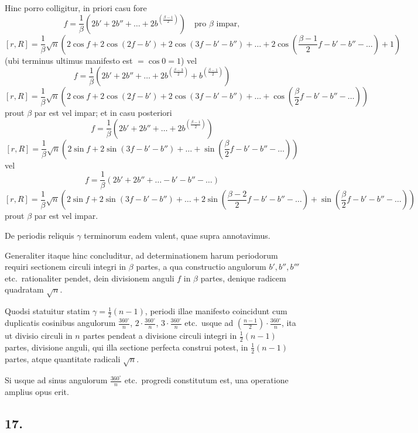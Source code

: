 \documentclass[12pt,a4paper]{article}
\begin{document}
Hinc porro colligitur, in priori casu fore
\[
f = \frac{1}{\beta}(2b' + 2b'' + \ldots + 2b^{(\frac{\beta-1}{2})}) \quad\text{pro } \beta\text{ impar},
\]
\[
[r,R] = \frac{1}{\beta}\sqrt{n}\left(2\cos f + 2\cos(2f - b') + 2\cos(3f - b' - b'') + \ldots + 2\cos\left(\frac{\beta-1}{2}f - b' - b'' - \ldots\right) + 1\right)
\]
(ubi terminus ultimus manifesto est $= \cos 0 = 1$)
vel
\[
f = \frac{1}{\beta}(2b' + 2b'' + \ldots + 2b^{(\frac{\beta-3}{2})} + b^{(\frac{\beta-1}{2})})
\]
\[
[r,R] = \frac{1}{\beta}\sqrt{n}\left(2\cos f + 2\cos(2f - b') + 2\cos(3f - b' - b'') + \ldots + \cos\left(\frac{\beta}{2}f - b' - b'' - \ldots\right)\right)
\]
prout $\beta$ par est vel impar; et in casu posteriori
\[
f = \frac{1}{\beta}(2b' + 2b'' + \ldots + 2b^{(\frac{\beta-1}{2})})
\]
\[
[r,R] = \frac{1}{\beta}\sqrt{n}\left(2\sin f + 2\sin(3f - b' - b'') + \ldots + \sin\left(\frac{\beta}{2}f - b' - b'' - \ldots\right)\right)
\]
vel
\[
f = \frac{1}{\beta}(2b' + 2b'' + \ldots - b' - b'' - \ldots)
\]
\[
[r,R] = \frac{1}{\beta}\sqrt{n}\left(2\sin f + 2\sin(3f - b' - b'') + \ldots + 2\sin\left(\frac{\beta-2}{2}f - b' - b'' - \ldots\right) + \sin\left(\frac{\beta}{2}f - b' - b'' - \ldots\right)\right)
\]
prout $\beta$ par est vel impar.

De periodis reliquis $\gamma$ terminorum eadem valent, quae supra annotavimus.

Generaliter itaque hinc concluditur, ad determinationem harum periodorum requiri sectionem circuli integri in $\beta$ partes, a qua constructio angulorum $b', b'', b'''$ etc.\ rationaliter pendet, dein divisionem anguli $f$ in $\beta$ partes, denique radicem quadratam $\sqrt{n}$.

Quodsi statuitur statim $\gamma = \frac{1}{2}(n-1)$, periodi illae manifesto coincidunt cum duplicatis cosinibus angulorum $\frac{360^\circ}{n}$, $2\cdot\frac{360^\circ}{n}$, $3\cdot\frac{360^\circ}{n}$ etc.\ usque ad $(\frac{n-1}{2})\cdot\frac{360^\circ}{n}$, ita ut divisio circuli in $n$ partes pendeat a divisione circuli integri in $\frac{1}{2}(n-1)$ partes, divisione anguli, qui illa sectione perfecta construi potest, in $\frac{1}{2}(n-1)$ partes, atque quantitate radicali $\sqrt{n}$.

Si usque ad sinus angulorum $\frac{360^\circ}{n}$ etc.\ progredi constitutum est, una operatione amplius opus erit.

\subsection*{17.}
\end{document}
